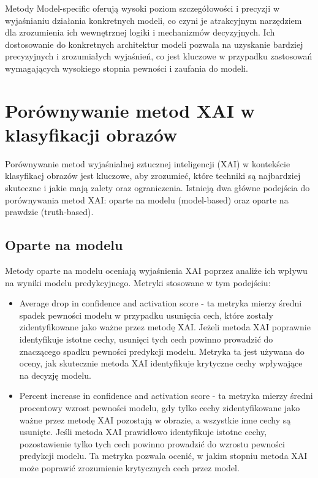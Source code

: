 Metody Model-specific oferują wysoki poziom szczegółowości i precyzji w wyjaśnianiu działania konkretnych modeli, co czyni je atrakcyjnym narzędziem dla zrozumienia ich wewnętrznej logiki i mechanizmów decyzyjnych. Ich dostosowanie do konkretnych architektur modeli pozwala na uzyskanie bardziej precyzyjnych i zrozumiałych wyjaśnień, co jest kluczowe w przypadku zastosowań wymagających wysokiego stopnia pewności i zaufania do modeli.

\section*{Porównywanie metod XAI w klasyfikacji obrazów}
Porównywanie metod wyjaśnialnej sztucznej inteligencji (XAI) w kontekście klasyfikacj obrazów jest kluczowe, aby zrozumieć, które techniki są najbardziej skuteczne i jakie mają zalety oraz ograniczenia.
Istnieją dwa główne podejścia do porównywania metod XAI: oparte na modelu (model-based) oraz oparte na prawdzie (truth-based).

\subsection*{Oparte na modelu}
Metody oparte na modelu oceniają wyjaśnienia XAI poprzez analiże ich wpływu na wyniki modelu predykcyjnego.
Metryki stosowane w tym podejściu:
\begin{itemize}
	\item Average drop in confidence and activation score - ta metryka mierzy średni spadek pewności modelu w przypadku usunięcia cech, które zostały zidentyfikowane jako ważne przez metodę XAI.
	      Jeżeli metoda XAI poprawnie identyfikuje istotne cechy, usunięci tych cech powinno prowadzić do znaczącego spadku pewności predykcji modelu.
	      Metryka ta jest używana do oceny, jak skutecznie metoda XAI identyfikuje krytyczne cechy wpływające na decyzję modelu.
	\item Percent increase in confidence and activation score - ta metryka mierzy średni procentowy wzrost pewności modelu, gdy tylko cechy zidentyfikowane jako ważne przez metodę XAI pozostają w obrazie, a wszystkie inne cechy są usunięte.
	      Jeśli metoda XAI prawidłowo identyfikuje istotne cechy, pozostawienie tylko tych cech powinno prowadzić do wzrostu pewności predykcji modelu.
	      Ta metryka pozwala ocenić, w jakim stopniu metoda XAI może poprawić zrozumienie krytycznych cech przez model.
\end{itemize}

